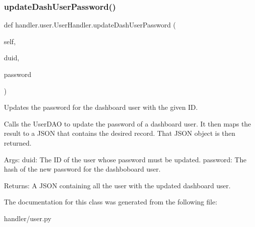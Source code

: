 \subsubsection{\texorpdfstring{update\+Dash\+User\+Password()}{updateDashUserPassword()}}
{\footnotesize\ttfamily def handler.\+user.\+User\+Handler.\+update\+Dash\+User\+Password (\begin{DoxyParamCaption}\item[{}]{self,  }\item[{}]{duid,  }\item[{}]{password }\end{DoxyParamCaption})}

\begin{DoxyVerb}Updates the password for the dashboard user with the given ID.

Calls the UserDAO to update the password of a dashboard user. It then
maps the result to a JSON that contains the desired record. That JSON 
object is then returned.

Args:
    duid: The ID of the user whose password must be updated.
    password: The hash of the new password for the dashboboard user.

Returns:
    A JSON containing all the user with the updated dashboard user.
\end{DoxyVerb}
 

The documentation for this class was generated from the following file\+:\begin{DoxyCompactItemize}
\item 
handler/user.\+py\end{DoxyCompactItemize}
